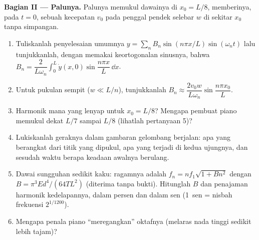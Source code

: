 \begin{problem}
\medskip
\noindent\textbf{Bagian II --- Palunya.}
Palunya memukul dawainya di $x_0 = L/8$, memberinya, pada $t = 0$, sebuah
kecepatan $v_0$ pada penggal pendek selebar $w$ di sekitar $x_0$ tanpa
simpangan.
\begin{enumerate}[resume]
  \item Tuliskanlah penyelesaian umumnya $y = \sum_nB_n\sin(n\pi x/L)\sin(\omega_nt)$
        lalu tunjukkanlah, dengan memakai keortogonalan sinusnya, bahwa $B_n =
        \dfrac{2}{L\omega_n}\int_0^L\dot y(x, 0)\sin\dfrac{n\pi x}L\,\dd x$.
  \item Untuk pukulan sempit ($w \ll L/n$), tunjukkanlah $B_n \approx \dfrac{2v_0w}
        {L\omega_n}\sin\dfrac{n\pi x_0}{L}$.
  \item Harmonik mana yang lenyap untuk $x_0 = L/8$? Mengapa pembuat piano
        memukul dekat $L/7$ sampai $L/8$ (lihatlah pertanyaan 5)?
  \item Lukiskanlah geraknya dalam gambaran gelombang berjalan: apa yang
        berangkat dari titik yang dipukul, apa yang terjadi di kedua ujungnya, dan sesudah
        waktu berapa keadaan awalnya berulang.
  \item Dawai sungguhan sedikit kaku: ragamnya adalah $f_n = nf_1
        \sqrt{1 + Bn^2}$ dengan $B = \pi^3Ed^4/(64TL^2)$ (diterima tanpa bukti). Hitunglah
        $B$ dan penajaman harmonik kedelapannya, dalam persen dan
        dalam sen (\qty{1}{sen} = nisbah frekuensi $2^{1/1200}$).
  \item Mengapa penala piano ``meregangkan'' oktafnya (melaras nada tinggi
        sedikit lebih tajam)?
\end{enumerate}


\end{problem}
